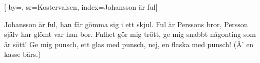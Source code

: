 

[ 		%
	by={},					%
	sr={Kostervalsen},					%
	index={Johansson är ful}]						%
	

\beginverse*						%
Johansson är ful,
han får gömma sig i ett skjul.
Ful är Perssons bror,
Persson själv har glömt var han bor.
Fulhet gör mig trött,
ge mig snabbt någonting som är sött!
Ge mig punsch,
ett glas med punsch,
nej, en flaska med punsch!
(Å' en kasse bärs.)
\endverse							%
\endsong							%